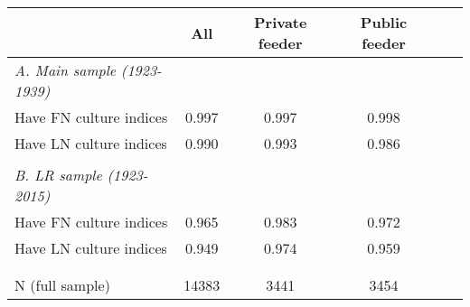 \begin{tabular}{l*{5}{c}}
\toprule
& All& Private feeder& Public feeder\\
\midrule
\emph{A. Main sample (1923-1939)}\\
Have FN culture indices& 0.997& 0.997& 0.998\\
Have LN culture indices& 0.990& 0.993& 0.986\\
\\[-1.0em]
\emph{B. LR sample (1923-2015)}\\
Have FN culture indices& 0.965& 0.983& 0.972\\
Have LN culture indices& 0.949& 0.974& 0.959\\
\\[-1.0em]
\\
N (full sample)	&    14383	&     3441	&     3454\\
\bottomrule
\end{tabular}
